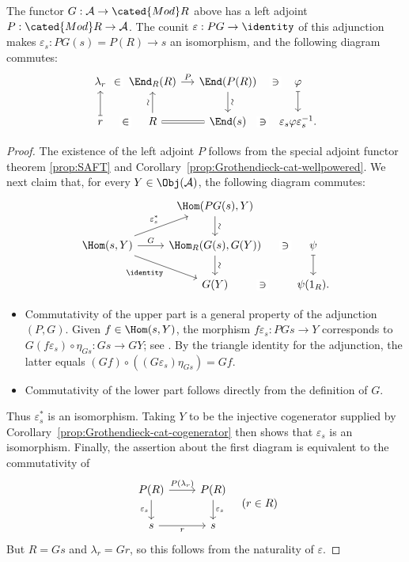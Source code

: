 \begin{lemma}\label{prop:GP-prep}
	The functor $G:\mathcal{A}\to\cated{Mod}R$ above has a left adjoint $P:\cated{Mod}R\to\mathcal{A}$. The counit $\varepsilon:PG\to\identity$ of this adjunction makes $\varepsilon_s:PG(s)=P(R)\to s$ an isomorphism, and the following diagram commutes:
	\[\begin{tikzcd}[column sep=small]
		\lambda_r \arrow[phantom, r, "\in" description] & \End_R(R) \arrow[r, "P"] & \End(P(R)) \arrow[d, "\sim" sloped] & \varphi \arrow[phantom, l, "\ni" description] \arrow[mapsto, d] \\
		r \arrow[phantom, r, "\in" description] \arrow[mapsto, u] & R \arrow[u, "\sim" sloped] \arrow[equal, r] & \End(s) & \varepsilon_s \varphi \varepsilon_s^{-1} \arrow[phantom, l, "\ni" description] .
	\end{tikzcd}\]
\end{lemma}
\begin{proof}
	The existence of the left adjoint $P$ follows from the special adjoint functor theorem \ref{prop:SAFT} and Corollary~\ref{prop:Grothendieck-cat-wellpowered}. We next claim that, for every $Y\in\Obj(\mathcal{A})$, the following diagram commutes:
	\[\begin{tikzcd}
		& \Hom(PG(s), Y) \arrow[d, "\sim" sloped] & \\
		\Hom(s, Y) \arrow[ru, "{\varepsilon_s^*}"] \arrow[r, "G"] \arrow[rd, "\identity"'] & \Hom_R(G(s), G(Y)) \arrow[d, "\sim" sloped] & \psi \arrow[phantom, l, "\ni" description, sloped] \arrow[mapsto, d] \\
		& G(Y) & \psi(1_R). \arrow[phantom, l, "\ni" description, sloped]
	\end{tikzcd}\]
	\begin{itemize}
		\item Commutativity of the upper part is a general property of the adjunction $(P,G)$. Given $f\in\Hom(s,Y)$, the morphism $f\varepsilon_s:PGs\to Y$ corresponds to $G(f\varepsilon_s)\circ\eta_{Gs}:Gs\to GY$; see \cite[(2.5)]{Li1}. By the triangle identity for the adjunction, the latter equals $(Gf)\circ\left((G\varepsilon_s)\eta_{Gs}\right)=Gf$.
		\item Commutativity of the lower part follows directly from the definition of $G$.
	\end{itemize}

	Thus $\varepsilon_s^*$ is an isomorphism. Taking $Y$ to be the injective cogenerator supplied by Corollary~\ref{prop:Grothendieck-cat-cogenerator} then shows that $\varepsilon_s$ is an isomorphism. Finally, the assertion about the first diagram is equivalent to the commutativity of
	\[\begin{tikzcd}
		P(R) \arrow[r, "{P(\lambda_r)}"] \arrow[d, "{\varepsilon_s}"'] & P(R) \arrow[d, "{\varepsilon_s}"] \\
		s \arrow[r, "r"'] & s
	\end{tikzcd} \quad (r \in R) \]
	But $R=Gs$ and $\lambda_r=Gr$, so this follows from the naturality of $\varepsilon$.
\end{proof}

